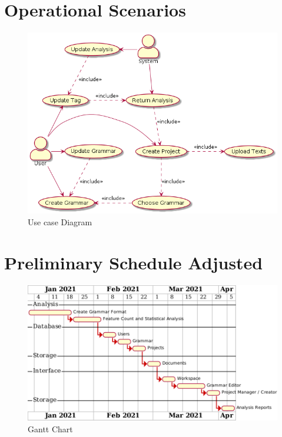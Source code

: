 \documentclass[12pt]{article}
\begin{document}
\section{Operational Scenarios}
\begin{figure}[H]
    \includegraphics[width=15cm]{Images/usecase.png}
    \caption{Use case Diagram}
\end{figure}

\section{Preliminary Schedule Adjusted}
\begin{figure}[H]
    \includegraphics[width=15cm]{Images/gantt.png}
    \caption{Gantt Chart}
\end{figure}
\end{document}
